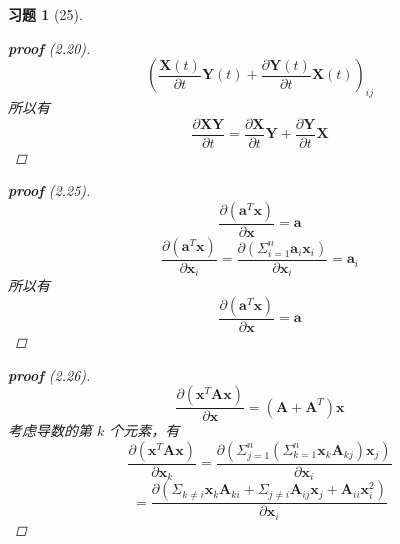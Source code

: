 \documentclass[a4paper, UTF8]{ctexart}
\newtheorem*{exercise}{\textbf{习题}}
\begin{document}
\begin{exercise}[25]
\begin{proof}[\textbf{proof} (2.20)]
\begin{equation*}
      \end{equation*}
      \begin{equation*}
        \left( \frac{\mathbf{X}\left( t \right)}{\partial t}\mathbf{Y}\left( t \right) + \frac{\partial \mathbf{Y}\left( t \right)}{\partial t}\mathbf{X}\left( t \right)\right)_{ij}
      \end{equation*}
      所以有
      \begin{equation*}
        \frac{\partial\mathbf{XY}}{\partial t} = \frac{\partial \mathbf{X}}{\partial t} \mathbf{Y} + \frac{\partial \mathbf{Y}}{\partial t} \mathbf{X}
      \end{equation*}
    \end{proof}
    \begin{proof}[\textbf{proof} (2.25)]
      \begin{equation*}
        \frac{\partial \left(\mathbf{a}^T\mathbf{x}\right)}{\partial \mathbf{x}} = \mathbf{a}
      \end{equation*}
      \begin{equation*}
        \frac{\partial \left( \mathbf{a}^T \mathbf{x} \right)}{\partial \mathbf{x}_i}= \frac{\partial \left( \Sigma_{i=1}^n \mathbf{a}_i \mathbf{x}_i \right)}{\partial \mathbf{x}_i} = \mathbf{a}_i
      \end{equation*}
      所以有
      \begin{equation*}
        \frac{\partial \left( \mathbf{a}^T \mathbf{x} \right)}{\partial \mathbf{x}} = \mathbf{a}
      \end{equation*}
    \end{proof}
    \begin{proof}[\textbf{proof} (2.26)]
      \begin{equation*}
        \frac{\partial \left(\mathbf{x}^T \mathbf{A} \mathbf{x}\right)}{\partial \mathbf{x}} = \left( \mathbf{A} + \mathbf{A}^T \right) \mathbf{x}
      \end{equation*}
      考虑导数的第 $k$ 个元素，有
      \begin{equation*}
        \frac{\partial \left( \mathbf{x}^T \mathbf{A}\mathbf{x} \right)}{\partial \mathbf{x}_k} = \frac{\partial \left( \Sigma_{j=1}^n \left( \Sigma_{k=1}^n \mathbf{x}_k \mathbf{A}_{kj} \right) \mathbf{x}_j \right)}{\partial \mathbf{x}_i}
      \end{equation*}
      \begin{equation*}
        = \frac{\partial \left( \Sigma_{k\neq i} \mathbf{x}_k \mathbf{A}_{ki} + \Sigma_{j \neq i} \mathbf{A}_{ij} \mathbf{x}_j + \mathbf{A}_{ii}\mathbf{x}_i^2 \right)}{\partial \mathbf{x}_i}
      \end{equation*}
    \end{proof}
  \end{exercise}
\end{document}
